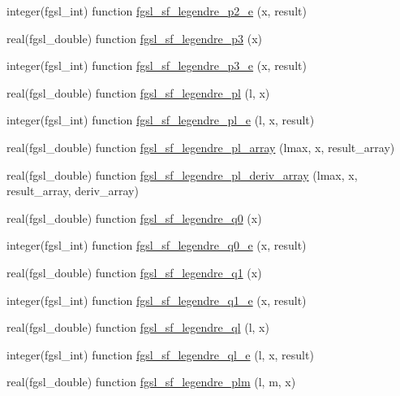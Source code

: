 \begin{DoxyCompactItemize}
integer(fgsl\-\_\-int) function \hyperlink{specfunc_8finc_a2650254eeeb5b0047d60c8710c64cc7a}{fgsl\-\_\-sf\-\_\-legendre\-\_\-p2\-\_\-e} (x, result)
\item 
real(fgsl\-\_\-double) function \hyperlink{specfunc_8finc_a716b4f9763c898ae50a684e3008d50f1}{fgsl\-\_\-sf\-\_\-legendre\-\_\-p3} (x)
\item 
integer(fgsl\-\_\-int) function \hyperlink{specfunc_8finc_a7ce68144036ae6e97c835517bbc45400}{fgsl\-\_\-sf\-\_\-legendre\-\_\-p3\-\_\-e} (x, result)
\item 
real(fgsl\-\_\-double) function \hyperlink{specfunc_8finc_afb0baf64a977e0dabe33ad79c96570f8}{fgsl\-\_\-sf\-\_\-legendre\-\_\-pl} (l, x)
\item 
integer(fgsl\-\_\-int) function \hyperlink{specfunc_8finc_aa58254a8ae52577f262870394cdd2e82}{fgsl\-\_\-sf\-\_\-legendre\-\_\-pl\-\_\-e} (l, x, result)
\item 
real(fgsl\-\_\-double) function \hyperlink{specfunc_8finc_aa632d778e7b18f2eb2088bb28b6e6b4e}{fgsl\-\_\-sf\-\_\-legendre\-\_\-pl\-\_\-array} (lmax, x, result\-\_\-array)
\item 
real(fgsl\-\_\-double) function \hyperlink{specfunc_8finc_a90ab44200f64ec38d8bca55a7b0f0e6d}{fgsl\-\_\-sf\-\_\-legendre\-\_\-pl\-\_\-deriv\-\_\-array} (lmax, x, result\-\_\-array, deriv\-\_\-array)
\item 
real(fgsl\-\_\-double) function \hyperlink{specfunc_8finc_a947175f5f90940488727610a78674043}{fgsl\-\_\-sf\-\_\-legendre\-\_\-q0} (x)
\item 
integer(fgsl\-\_\-int) function \hyperlink{specfunc_8finc_ad601f9cd38bce88eafd6800f6c5dfce0}{fgsl\-\_\-sf\-\_\-legendre\-\_\-q0\-\_\-e} (x, result)
\item 
real(fgsl\-\_\-double) function \hyperlink{specfunc_8finc_af91dbd074093a7e9197a9c056faa8bd9}{fgsl\-\_\-sf\-\_\-legendre\-\_\-q1} (x)
\item 
integer(fgsl\-\_\-int) function \hyperlink{specfunc_8finc_a6717b9f8c5bbe2d16c0945f8f6ba4e31}{fgsl\-\_\-sf\-\_\-legendre\-\_\-q1\-\_\-e} (x, result)
\item 
real(fgsl\-\_\-double) function \hyperlink{specfunc_8finc_a241fb356e66dcf70f7490f778260efb7}{fgsl\-\_\-sf\-\_\-legendre\-\_\-ql} (l, x)
\item 
integer(fgsl\-\_\-int) function \hyperlink{specfunc_8finc_a37ea075ca4b4e399d0ce8d823f3bca11}{fgsl\-\_\-sf\-\_\-legendre\-\_\-ql\-\_\-e} (l, x, result)
\item 
real(fgsl\-\_\-double) function \hyperlink{specfunc_8finc_aa6ad8aad3b72623dc894234a51bf0f02}{fgsl\-\_\-sf\-\_\-legendre\-\_\-plm} (l, m, x)

\end{DoxyCompactItemize}
